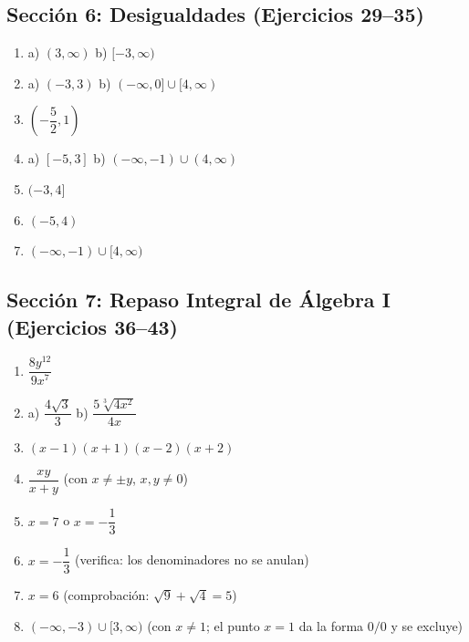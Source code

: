 \documentclass[12pt, letterpaper]{article}
\begin{document}
      \subsection*{Sección 6: Desigualdades (Ejercicios 29--35)}
      \begin{enumerate}[resume=respuestas, leftmargin=*, label=\textbf{\arabic*.}]
            \item a) $(3, \infty)$ \quad b) $[-3, \infty)$
            \item a) $(-3, 3)$ \quad b) $(-\infty, 0] \cup [4, \infty)$
            \item $\left(-\dfrac{5}{2}, 1\right)$
            \item a) $[-5, 3]$ \quad b) $(-\infty, -1) \cup (4, \infty)$
            \item $(-3, 4]$
            \item $(-5, 4)$
            \item $(-\infty, -1) \cup [4, \infty)$
      \end{enumerate}


      \subsection*{Sección 7: Repaso Integral de Álgebra I (Ejercicios 36--43)}
      \begin{enumerate}[resume=respuestas, leftmargin=*, label=\textbf{\arabic*.}]
            \item $\dfrac{8y^{12}}{9x^{7}}$
            \item a) $\dfrac{4\sqrt{3}}{3}$ \quad b) $\dfrac{5\sqrt[3]{4x^2}}{4x}$
            \item $(x - 1)(x + 1)(x - 2)(x + 2)$
            \item $\dfrac{xy}{x + y}$ (con $x \neq \pm y$, $x, y \neq 0$)
            \item $x = 7$ \quad o \quad $x = -\dfrac{1}{3}$
            \item $x = -\dfrac{1}{3}$ (verifica: los denominadores no se anulan)
            \item $x = 6$ (comprobación: $\sqrt{9} + \sqrt{4} = 5$)
            \item $(-\infty, -3) \cup [3, \infty)$ \quad (con $x \neq 1$; el punto $x = 1$ da la forma $0/0$ y se excluye)
      \end{enumerate}
\end{document}
